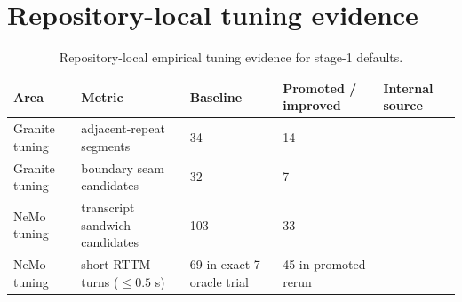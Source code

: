 \section{Repository-local tuning evidence}

\begin{table}[H]
\centering
\small
\begin{tabularx}{\textwidth}{L{2.4cm}L{2.7cm}L{2.2cm}L{2.2cm}Y}
\toprule
Area & Metric & Baseline & Promoted / improved & Internal source \\
\midrule
Granite tuning & adjacent-repeat segments & 34 & 14 & \cite{internal_granite_tuning_20260318} \\
Granite tuning & boundary seam candidates & 32 & 7 & \cite{internal_granite_tuning_20260318} \\
NeMo tuning & transcript sandwich candidates & 103 & 33 & \cite{internal_nemo_tuning_20260318} \\
NeMo tuning & short RTTM turns (\(\le 0.5\) s) & 69 in exact-7 oracle trial & 45 in promoted rerun & \cite{internal_nemo_tuning_20260318} \\
\bottomrule
\end{tabularx}
\caption{Repository-local empirical tuning evidence for stage-1 defaults.}
\label{tab:stage1-internal}
\end{table}
